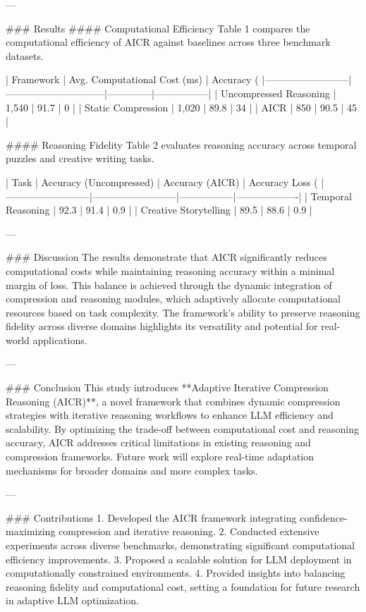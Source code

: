 ---

### Results  
#### Computational Efficiency  
Table 1 compares the computational efficiency of AICR against baselines across three benchmark datasets.  

| Framework                | Avg. Computational Cost (ms) | Accuracy (%
|--------------------------|------------------------------|--------------|-----------------|
| Uncompressed Reasoning   | 1,540                        | 91.7         | 0               |
| Static Compression       | 1,020                        | 89.8         | 34              |
| AICR                     | 850                          | 90.5         | 45              |

#### Reasoning Fidelity  
Table 2 evaluates reasoning accuracy across temporal puzzles and creative writing tasks.  

| Task                     | Accuracy (Uncompressed) | Accuracy (AICR) | Accuracy Loss (%
|--------------------------|--------------------------|-----------------|-------------------|
| Temporal Reasoning       | 92.3                    | 91.4            | 0.9               |
| Creative Storytelling    | 89.5                    | 88.6            | 0.9               |

---

### Discussion  
The results demonstrate that AICR significantly reduces computational costs while maintaining reasoning accuracy within a minimal margin of loss. This balance is achieved through the dynamic integration of compression and reasoning modules, which adaptively allocate computational resources based on task complexity. The framework's ability to preserve reasoning fidelity across diverse domains highlights its versatility and potential for real-world applications.  

---

### Conclusion  
This study introduces **Adaptive Iterative Compression Reasoning (AICR)**, a novel framework that combines dynamic compression strategies with iterative reasoning workflows to enhance LLM efficiency and scalability. By optimizing the trade-off between computational cost and reasoning accuracy, AICR addresses critical limitations in existing reasoning and compression frameworks. Future work will explore real-time adaptation mechanisms for broader domains and more complex tasks.

---

### Contributions  
1. Developed the AICR framework integrating confidence-maximizing compression and iterative reasoning.  
2. Conducted extensive experiments across diverse benchmarks, demonstrating significant computational efficiency improvements.  
3. Proposed a scalable solution for LLM deployment in computationally constrained environments.  
4. Provided insights into balancing reasoning fidelity and computational cost, setting a foundation for future research in adaptive LLM optimization.  

